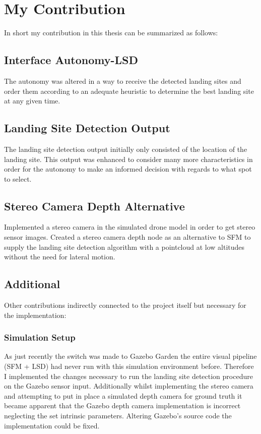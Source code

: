 \chapter{My Contribution}

In short my contribution in this thesis can be summarized as follows:

\section{Interface Autonomy-LSD}
The autonomy was altered in a way to receive the detected landing sites and order them according to an adequate heuristic to determine the best landing site at any given time.
\section{Landing Site Detection Output}
The landing site detection output initially only consisted of the location of the landing site. This output was enhanced to consider many more characteristics in order for the autonomy to make an informed decision with regards to what spot to select.
\section{Stereo Camera Depth Alternative}
Implemented a stereo camera in the simulated drone model in order to get stereo sensor images. Created a stereo camera depth node as an alternative to SFM to supply the landing site detection algorithm with a pointcloud at low altitudes without the need for lateral motion. 
\section{Additional}
Other contributions indirectly connected to the project itself but necessary for the implementation:
\subsection{Simulation Setup}
As just recently the switch was made to Gazebo Garden the entire visual pipeline (SFM + LSD) had never run with this simulation environment before. Therefore I implemented the changes necessary to run the landing site detection procedure on the Gazebo sensor input. Additionally whilst implementing the stereo camera and attempting to put in place a simulated depth camera for ground truth it became apparent that the Gazebo depth camera implementation is incorrect neglecting the set intrinsic parameters. Altering Gazebo's source code the implementation could be fixed.
